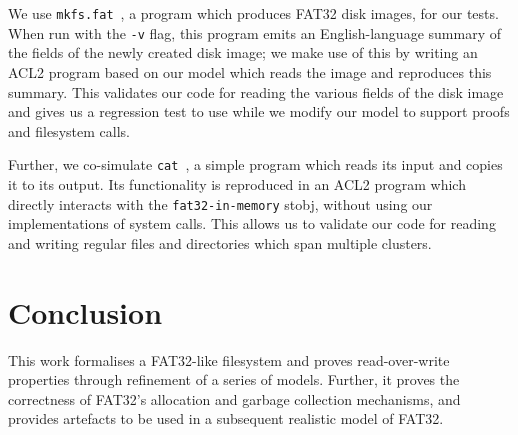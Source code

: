 \documentclass[submission,copyright,creativecommons]{eptcs}
\begin{document}
We use \texttt{mkfs.fat}~\cite{hudsonmkfs}, a program which produces
FAT32 disk images, for our tests. When run with the \texttt{-v} flag,
this program emits an English-language summary of the fields of the
newly created disk image; we make use of this by writing an ACL2
program based on our model which reads the image and reproduces this
summary. This validates our code for reading the various fields of the
disk image and gives us a regression test to use while we modify our
model to support proofs and filesystem calls.

Further, we co-simulate \texttt{cat}~\cite{granlundcat}, a simple
program which reads its input and copies it to its output. Its
functionality is reproduced in an ACL2 program which directly
interacts with the \texttt{fat32-in-memory} stobj, without using our
implementations of system calls. This allows us to validate our
code for reading and writing regular files and directories which span
multiple clusters.





\section{Conclusion}

This work formalises a FAT32-like filesystem and proves
read-over-write properties through refinement of a series of
models. Further, it proves the correctness of FAT32's allocation and
garbage collection mechanisms, and provides artefacts to be used in a
subsequent realistic model of FAT32.
\end{document}

